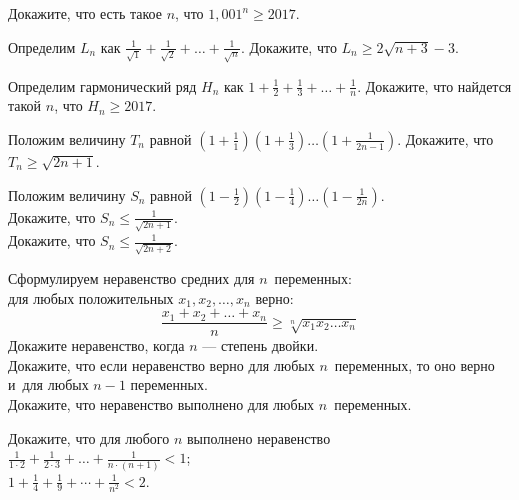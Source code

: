 


\begin{problems}

\item
Докажите, что есть такое $n$, что $1{,}001^{n} \geq 2017$.

\item
Определим $L_{n}$ как 
\(
    \frac{1}{\sqrt{1}} + \frac{1}{\sqrt{2}} + \ldots + \frac{1}{\sqrt{n}}
\).
Докажите, что $L_{n} \geq 2 \sqrt{n + 3} - 3$. 

\item
Определим гармонический ряд $H_{n}$ как 
\(
    1 + \frac{1}{2} + \frac{1}{3} + \ldots + \frac{1}{n}
\).
Докажите, что найдется такой $n$, что $H_{n} \geq 2017$.

\item
Положим величину $T_{n}$ равной
\(
    \left( 1 + \frac{1}{1} \right)
    \left( 1 + \frac{1}{3} \right)
    \ldots
    \left( 1 + \frac{1}{2n - 1} \right)
\).
Докажите, что $T_{n} \geq \sqrt{2 n + 1}$.

\item
Положим величину $S_{n}$ равной
\(
    \left( 1 - \frac{1}{2} \right)
    \left( 1 - \frac{1}{4} \right)
    \ldots
    \left( 1 - \frac{1}{2n} \right)
\).
\\
\subproblem
Докажите, что $S_{n} \leq \frac{1}{\sqrt{2 n + 1}}$.
\\
\subproblem
Докажите, что $S_{n} \leq \frac{1}{\sqrt{2 n + 2}}$.

\item
Сформулируем неравенство средних для $n$~переменных:\\
для любых положительных $x_1, x_2, \ldots, x_n$ верно:
\[
    \frac{x_{1} + x_{2} + \ldots + x_{n}}{n}
\geq
    \sqrt[n]{x_{1} x_{2} \ldots x_{n}}
\]
\subproblem
Докажите неравенство, когда $n$ --- степень двойки.
\\
\subproblem
Докажите, что если неравенство верно для любых $n$~переменных, то оно верно
и~для любых $n - 1$ переменных.
\\
\subproblem
Докажите, что неравенство выполнено для любых $n$~переменных.

\item
Докажите, что для любого $n$ выполнено неравенство
\\[0.5ex]
\subproblem
\( \displaystyle
    \frac{1}{1 \cdot 2} + \frac{1}{2 \cdot 3} + \ldots
    + \frac{1}{n \cdot (n + 1)}
<
    1
\);
\\[1.0ex]
\subproblem
\( \displaystyle
    1 + \frac{1}{4} + \frac{1}{9} + \cdots + \frac{1}{n^2}
<
    2
\).

\end{problems}

